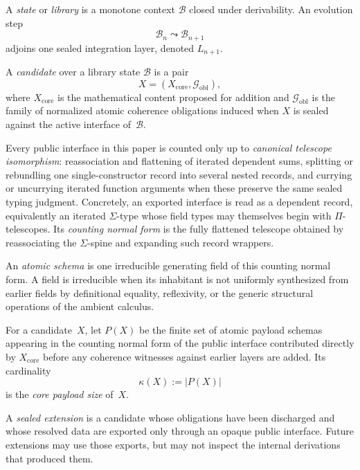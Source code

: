 \documentclass{lmcs}
\newcommand{\B}{\mathcal{B}}
\newcommand{\Gcal}{\mathcal{G}}
\begin{document}
\begin{defi}[State]
\label{def:state}
A \emph{state} or \emph{library} is a monotone context $\B$ closed under derivability. An evolution step
\[
  \B_n \leadsto \B_{n+1}
\]
adjoins one sealed integration layer, denoted $L_{n+1}$.
\end{defi}

\begin{defi}[Candidate]
\label{def:candidate}
A \emph{candidate} over a library state $\B$ is a pair
\[
  X = (X_{\mathrm{core}}, \Gcal_{\mathrm{obl}}),
\]
where $X_{\mathrm{core}}$ is the mathematical content proposed for addition and $\Gcal_{\mathrm{obl}}$ is the family of normalized atomic coherence obligations induced when $X$ is sealed against the active interface of~$\B$.
\end{defi}

\begin{defi}
\label{def:atomic-schema}
Every public interface in this paper is counted only up to \emph{canonical telescope isomorphism}: reassociation and flattening of iterated dependent sums, splitting or rebundling one single-constructor record into several nested records, and currying or uncurrying iterated function arguments when these preserve the same sealed typing judgment. Concretely, an exported interface is read as a dependent record, equivalently an iterated $\Sigma$-type whose field types may themselves begin with $\Pi$-telescopes. Its \emph{counting normal form} is the fully flattened telescope obtained by reassociating the $\Sigma$-spine and expanding such record wrappers.

An \emph{atomic schema} is one irreducible generating field of this counting normal form. A field is irreducible when its inhabitant is not uniformly synthesized from earlier fields by definitional equality, reflexivity, or the generic structural operations of the ambient calculus.
\end{defi}

\begin{defi}
\label{def:payload}
For a candidate~$X$, let $P(X)$ be the finite set of atomic payload schemas appearing in the counting normal form of the public interface contributed directly by $X_{\mathrm{core}}$ before any coherence witnesses against earlier layers are added. Its cardinality
\[
  \kappa(X) := |P(X)|
\]
is the \emph{core payload size} of~$X$.
\end{defi}

\begin{defi}
\label{def:sealed}
A \emph{sealed extension} is a candidate whose obligations have been discharged and whose resolved data are exported only through an opaque public interface. Future extensions may use those exports, but may not inspect the internal derivations that produced them.
\end{defi}
\end{document}
